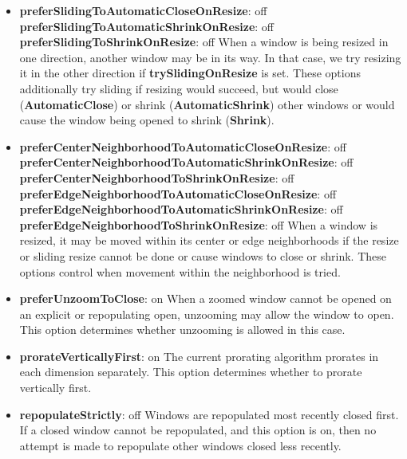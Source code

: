 \begin{itemize}
\item {\bf preferSlidingToAutomaticCloseOnResize}: off\newline{}
{\bf preferSlidingToAutomaticShrinkOnResize}: off\newline{}
{\bf preferSlidingToShrinkOnResize}: off\newline{}
When a window is being resized in one direction, another window may be
in its way.  In that case, we try resizing it in the other
direction if {\bf trySlidingOnResize} is set.  These options
additionally try sliding if resizing would succeed, but would
close ({\bf AutomaticClose}) or shrink
({\bf AutomaticShrink}) other windows or
would cause the window being opened to shrink ({\bf Shrink}).

\item {\bf preferCenterNeighborhoodToAutomaticCloseOnResize}: off\newline{}
{\bf preferCenterNeighborhoodToAutomaticShrinkOnResize}: off\newline{}
{\bf preferCenterNeighborhoodToShrinkOnResize}: off\newline{}
{\bf preferEdgeNeighborhoodToAutomaticCloseOnResize}: off\newline{}
{\bf preferEdgeNeighborhoodToAutomaticShrinkOnResize}: off\newline{}
{\bf preferEdgeNeighborhoodToShrinkOnResize}: off\newline{}
When a window is resized, it may be moved within its center
or edge neighborhoods if the resize or sliding resize cannot be
done or cause windows to close or shrink.  These options control
when movement within the neighborhood is tried.

\item {\bf preferUnzoomToClose}: on\newline{}
When a zoomed window cannot be opened on an explicit or
repopulating open, unzooming may allow the window to open.
This option determines whether unzooming is allowed in this case.

\item {\bf prorateVerticallyFirst}: on\newline{}
The current prorating algorithm prorates in each dimension
separately.  This option determines whether to prorate vertically
first.

\item {\bf repopulateStrictly}: off\newline{}
Windows are repopulated most recently closed first.  If a closed
window cannot be repopulated, and this option is on, then no
attempt is made to repopulate other windows closed less recently.


\end{itemize}
